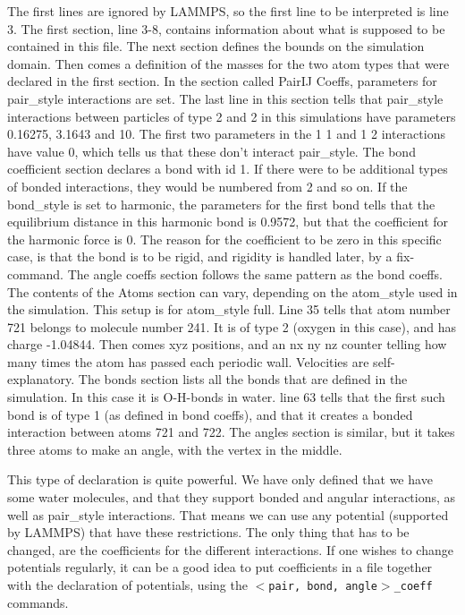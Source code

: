 The first lines are ignored by LAMMPS, so the first line to be interpreted is line 3. The first section, line 3-8, contains information about what is supposed to be contained in this file. The next section defines the bounds on the simulation domain. Then comes a definition of the masses for the two atom types that were declared in the first section. In the section called PairIJ Coeffs, parameters for pair\_style interactions are set. The last line in this section tells that pair\_style interactions between particles of type 2 and 2 in this simulations have parameters 0.16275, 3.1643 and 10. The first two parameters in the 1 1 and 1 2 interactions have value 0, which tells us that these don't interact pair\_style. The bond coefficient section declares a bond with id 1. If there were to be additional types of bonded interactions, they would be numbered from 2 and so on. If the bond\_style is set to harmonic, the parameters for the first bond tells that the equilibrium distance in this harmonic bond is 0.9572, but that the coefficient for the harmonic force is 0. The reason for the coefficient to be zero in this specific case, is that the bond is to be rigid, and rigidity is handled later, by a fix-command. The angle coeffs section follows the same pattern as the bond coeffs. The contents of the Atoms section can vary, depending on the atom\_style used in the simulation. This setup is for atom\_style full. Line 35 tells that atom number 721 belongs to molecule number 241. It is of type 2 (oxygen in this case), and has charge -1.04844. Then comes xyz positions, and an nx ny nz counter telling how many times the atom has passed each periodic wall. Velocities are self-explanatory. The bonds section lists all the bonds that are defined in the simulation. In this case it is O-H-bonds in water. line 63 tells that the first such bond is of type 1 (as defined in bond coeffs), and that it creates a bonded interaction between atoms 721 and 722. The angles section is similar, but it takes three atoms to make an angle, with the vertex in the middle. 

This type of declaration is quite powerful. We have only defined that we have some water molecules, and that they support bonded and angular interactions, as well as pair\_style interactions. That means we can use any potential (supported by LAMMPS) that have these restrictions. The only thing that has to be changed, are the coefficients for the different interactions. If one wishes to change potentials regularly, it can be a good idea to put coefficients in a file together with the declaration of potentials, using the {\tt $<$pair, bond, angle$>$\_coeff } commands. 

